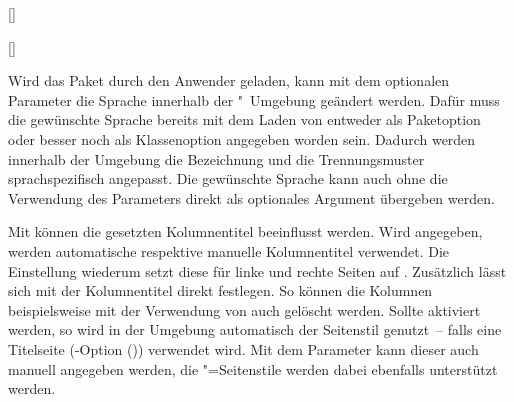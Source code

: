 \begin{Declaration*}{}
\begin{Declaration*}{}
\begin{Declaration*}{}
\begin{Declaration}{[]}
\begin{Declaration}{[]}
\begin{Declaration}{}
\begin{Declaration}[v2.02]{}
\begin{Declaration}[v2.02]{%
}
\begin{Declaration}{}
\begin{Declaration}{}
Wird das Paket  durch den Anwender geladen, kann mit dem 
optionalen Parameter die 
Sprache innerhalb der "~Umgebung geändert werden. Dafür 
muss die gewünschte Sprache bereits mit dem Laden von  entweder 
als Paketoption oder besser noch als Klassenoption angegeben worden sein. 
Dadurch werden innerhalb der Umgebung die Bezeichnung  und 
die Trennungsmuster sprachspezifisch angepasst. Die gewünschte Sprache kann 
auch ohne die Verwendung des Parameters  
direkt als optionales Argument übergeben werden.

Mit  können die gesetzten Kolumnentitel 
beeinflusst werden. Wird  
angegeben, werden automatische respektive manuelle Kolumnentitel verwendet. Die 
Einstellung  wiederum setzt diese 
für linke und rechte Seiten auf . Zusätzlich lässt sich mit 
 der 
Kolumnentitel direkt festlegen. So können die Kolumnen beispielsweise mit der 
Verwendung von  auch 
gelöscht werden. Sollte  aktiviert 
werden, so wird in der Umgebung automatisch der Seitenstil  
genutzt~-- falls eine Titelseite
(\KOMAScript-Option ()) verwendet 
wird. Mit dem Parameter  kann dieser 
auch manuell angegeben werden, die "=Seitenstile 
werden dabei ebenfalls unterstützt werden.


\end{Declaration}
\end{Declaration}
\end{Declaration}
\end{Declaration}
\end{Declaration}
\end{Declaration}
\end{Declaration}
\end{Declaration*}
\end{Declaration*}
\end{Declaration*}

